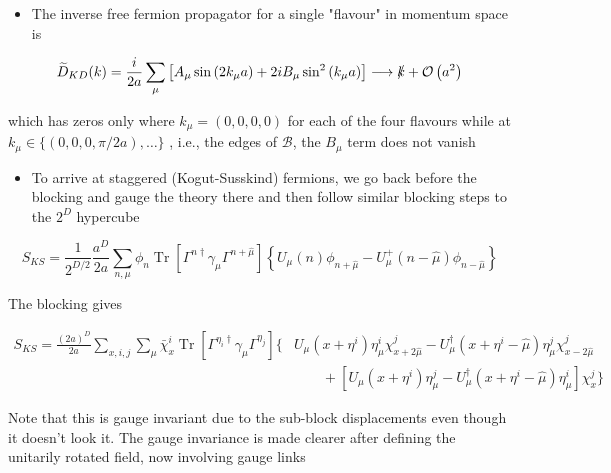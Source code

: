 \begin{itemize}
  \item The inverse free fermion propagator for a single "flavour" in momentum space is
\end{itemize}

\begin{equation}
\widetilde{D}_{KD}(k)=\frac{i}{2 a} \sum_{\mu}\left[A_{\mu} \sin \left(2 k_{\mu} a\right)+2 i B_{\mu} \sin ^{2}\left(k_{\mu} a\right)\right] \longrightarrow \slashed{k}+{\cal O}\left(a^{2}\right)
\end{equation}

which has zeros only where \(k_{\mu}=(0,0,0,0)\) for each of the four flavours while at \(k_{\mu}\in\{(0,0,0, \pi / 2 a),\ldots\}\) , i.e., the edges of $\mathcal{B}$, the $B_\mu$ term does not vanish

\begin{itemize}
  \item To arrive at staggered (Kogut-Susskind) fermions, we go back before the blocking and gauge the theory there and then follow similar blocking steps to the \(2^{D}\) hypercube
\end{itemize}

\begin{equation}
S_{KS}=\frac{1}{2^{D / 2}} \frac{a^{D}}{2 a}\sum_{n , \mu} \phi_{n} \operatorname{Tr}\left[\Gamma^{n {\dagger}} \gamma_{\mu} \Gamma^{n+\hat{\mu}}\right]\left\{U_{\mu}(n) \phi_{n+\hat{\mu}}-U_{\mu}^{+}(n-\hat{\mu}) \phi_{n-\hat{\mu}}\right\}
\end{equation}

The blocking gives

\begin{equation}
\begin{aligned}
S_{KS}=\frac{(2 a)^D}{2 a} \sum_{x, i , j} \sum_{\mu} \bar{\chi}_{x}^{i} \operatorname{Tr}\left[\Gamma^{\eta_{i} {\dagger}} \gamma_\mu \Gamma^{\eta_j} \right]\Big\{&U_{\mu}\left(x+\eta^{i}\right) \eta_{\mu}^{i} \chi_{x+2 \hat{\mu}}^{j}-U_{\mu}^{\dagger}\left(x+\eta^{i}-\hat{\mu}\right) \eta_{\mu}^{j} \chi_{x-2 \hat{\mu}}^{j} \\
&\qquad +\left[U_{\mu}\left(x+\eta^{i}\right) \eta_{\mu}^{j}-U_{\mu}^{\dagger}\left(x+\eta^{i}-\hat{\mu}\right) \eta_{\mu}^{i}\right] \chi_{x}^{j}\Big\}
\end{aligned}
\end{equation}

Note that this is gauge invariant due to the sub-block displacements even though it doesn't look it.
The gauge invariance is made clearer after defining the unitarily rotated field, now involving gauge links

